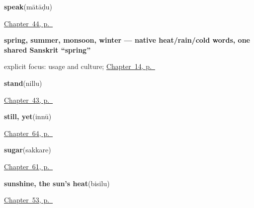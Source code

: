 \noindent\begin{minipage}[t]{\linewidth}
\raggedright
\textbf{speak}\enspace\emph{}\enspace(mātāḍu)\par
\footnotesize \hyperref[ch:ka-see-say]{Chapter~44, p.~\pageref*{ch:ka-see-say}}
\end{minipage}\par\smallskip

\noindent\begin{minipage}[t]{\linewidth}
\raggedright
\textbf{spring, summer, monsoon, winter — native heat/rain/cold words, one shared Sanskrit \textquotedblleft{}spring\textquotedblright{}}\enspace\emph{    }\par
\footnotesize explicit focus: usage and culture; \hyperref[ch:ka-seasons]{Chapter~14, p.~\pageref*{ch:ka-seasons}}
\end{minipage}\par\smallskip

\noindent\begin{minipage}[t]{\linewidth}
\raggedright
\textbf{stand}\enspace\emph{}\enspace(nillu)\par
\footnotesize \hyperref[ch:ka-more-verbs]{Chapter~43, p.~\pageref*{ch:ka-more-verbs}}
\end{minipage}\par\smallskip

\noindent\begin{minipage}[t]{\linewidth}
\raggedright
\textbf{still, yet}\enspace\emph{}\enspace(innū)\par
\footnotesize \hyperref[ch:ka-joining]{Chapter~64, p.~\pageref*{ch:ka-joining}}
\end{minipage}\par\smallskip

\noindent\begin{minipage}[t]{\linewidth}
\raggedright
\textbf{sugar}\enspace\emph{}\enspace(sakkare)\par
\footnotesize \hyperref[ch:ka-kitchen]{Chapter~61, p.~\pageref*{ch:ka-kitchen}}
\end{minipage}\par\smallskip

\noindent\begin{minipage}[t]{\linewidth}
\raggedright
\textbf{sunshine, the sun's heat}\enspace\emph{}\enspace(bisilu)\par
\footnotesize \hyperref[ch:ka-sky]{Chapter~53, p.~\pageref*{ch:ka-sky}}
\end{minipage}\par\smallskip

